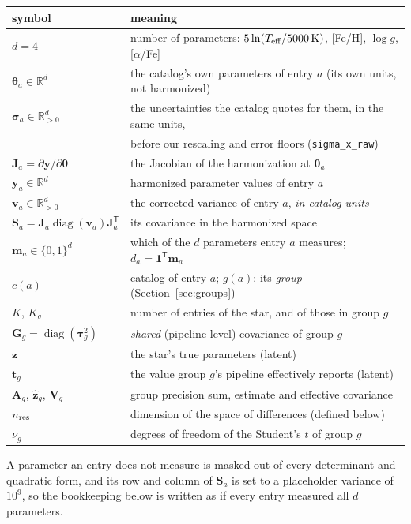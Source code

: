 \documentclass[11pt,a4paper]{article}
\newcommand{\bv}[1]{\boldsymbol{#1}}          %
\newcommand{\bM}[1]{\boldsymbol{#1}}          %
\newcommand{\T}{^{\mathsf T}}
\newcommand{\diag}{\operatorname{diag}}
\begin{document}
\begin{center}
\begin{tabular}{@{}ll@{}}
\toprule
symbol & meaning \\
\midrule
$d = 4$ & number of parameters: $5\ln(T_{\rm eff}/5000\,\mathrm{K})$, [Fe/H], $\log g$, [$\alpha$/Fe] \\
$\bv\theta_a \in \mathbb{R}^d$ & the catalog's own parameters of entry $a$ (its own units, not harmonized) \\
$\bv\sigma_a \in \mathbb{R}^d_{>0}$ & the uncertainties the catalog quotes for them, in the same units, \\
 & before our rescaling and error floors (\texttt{sigma\_x\_raw}) \\
$\bM J_a = \partial\bv y/\partial\bv\theta$ & the Jacobian of the harmonization at $\bv\theta_a$ \\
$\bv y_a \in \mathbb{R}^d$ & harmonized parameter values of entry $a$ \\
$\bv v_a \in \mathbb{R}^d_{>0}$ & the corrected variance of entry $a$, \emph{in catalog units} \\
$\bM S_a = \bM J_a \diag(\bv v_a)\bM J_a\T$ & its covariance in the harmonized space \\
$\bM m_a \in \{0,1\}^d$ & which of the $d$ parameters entry $a$ measures; $d_a = \bv 1\T \bM m_a$ \\
$c(a)$ & catalog of entry $a$; \quad $g(a)$: its \emph{group} (Section~\ref{sec:groups}) \\
$K$, $K_g$ & number of entries of the star, and of those in group $g$ \\
$\bM G_g = \diag(\bv\tau_g^2)$ & \emph{shared} (pipeline-level) covariance of group $g$ \\
$\bv z$ & the star's true parameters (latent) \\
$\bv t_g$ & the value group $g$'s pipeline effectively reports (latent) \\
$\bM A_g$, $\hat{\bv z}_g$, $\bM V_g$ & group precision sum, estimate and effective covariance \\
$n_{\rm res}$ & dimension of the space of differences (defined below) \\
$\nu_g$ & degrees of freedom of the Student's $t$ of group $g$ \\
\bottomrule
\end{tabular}
\end{center}

A parameter an entry does not measure is masked out of every determinant and
quadratic form, and its row and column of $\bM S_a$ is set to a placeholder
variance of $10^9$, so the bookkeeping below is written as if every entry
measured all $d$ parameters.
\end{document}
